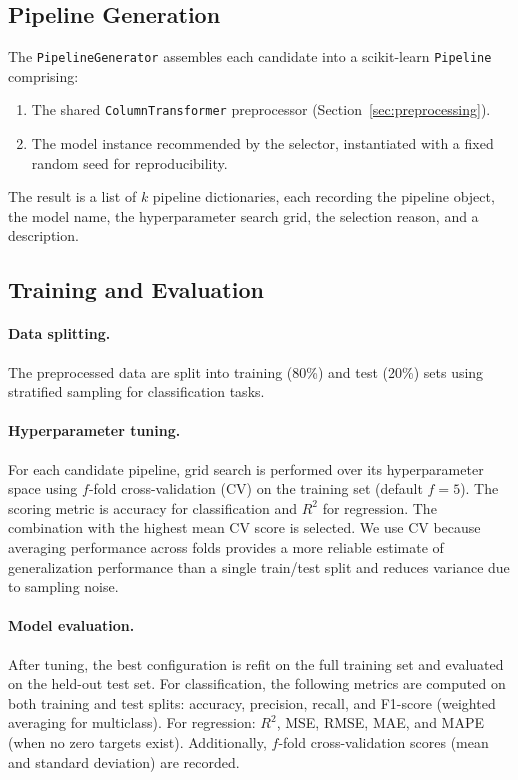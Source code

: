 \documentclass[conference]{llncs}
\begin{document}
   \subsection{Pipeline Generation}
   \label{sec:pipeline_gen}

   The \texttt{PipelineGenerator} assembles each candidate into a scikit-learn \texttt{Pipeline} comprising:
   \begin{enumerate}
   \item The shared \texttt{ColumnTransformer} preprocessor (Section~\ref{sec:preprocessing}).
   \item The model instance recommended by the selector, instantiated with a fixed random seed for reproducibility.
   \end{enumerate}
   The result is a list of $k$ pipeline dictionaries, each recording the pipeline object, the model name, the hyperparameter search grid, the selection reason, and a description.

   \subsection{Training and Evaluation}
   \label{sec:training}

   \paragraph{Data splitting.}
   The preprocessed data are split into training (80\%) and test (20\%) sets using stratified sampling for classification tasks.

   \paragraph{Hyperparameter tuning.}
    For each candidate pipeline, grid search is performed over its hyperparameter space using $f$-fold cross-validation (CV) on the training set (default $f=5$). The scoring metric is accuracy for classification and $R^2$ for regression. The combination with the highest mean CV score is selected. We use CV because averaging performance across folds provides a more reliable estimate of generalization performance than a single train/test split and reduces variance due to sampling noise.

   \paragraph{Model evaluation.}
   After tuning, the best configuration is refit on the full training set and evaluated on the held-out test set.
   For classification, the following metrics are computed on both training and test splits: accuracy, precision, recall, and F1-score (weighted averaging for multiclass).
   For regression: $R^2$, MSE, RMSE, MAE, and MAPE (when no zero targets exist).
   Additionally, $f$-fold cross-validation scores (mean and standard deviation) are recorded.
\end{document}
